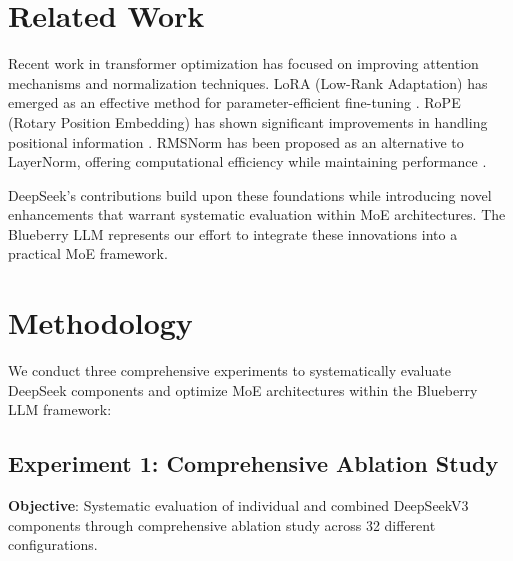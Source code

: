 \documentclass[11pt,a4paper]{article}
\begin{document}
\section{Related Work}

Recent work in transformer optimization has focused on improving attention mechanisms and normalization techniques. LoRA (Low-Rank Adaptation) has emerged as an effective method for parameter-efficient fine-tuning \cite{hu2021lora}. RoPE (Rotary Position Embedding) has shown significant improvements in handling positional information \cite{su2021roformer}. RMSNorm has been proposed as an alternative to LayerNorm, offering computational efficiency while maintaining performance \cite{zhang2019root}.

DeepSeek's contributions build upon these foundations while introducing novel enhancements that warrant systematic evaluation within MoE architectures. The Blueberry LLM represents our effort to integrate these innovations into a practical MoE framework.

\section{Methodology}

We conduct three comprehensive experiments to systematically evaluate DeepSeek components and optimize MoE architectures within the Blueberry LLM framework:

\subsection{Experiment 1: Comprehensive Ablation Study}

\textbf{Objective}: Systematic evaluation of individual and combined DeepSeekV3 components through comprehensive ablation study across 32 different configurations.
\end{document}
